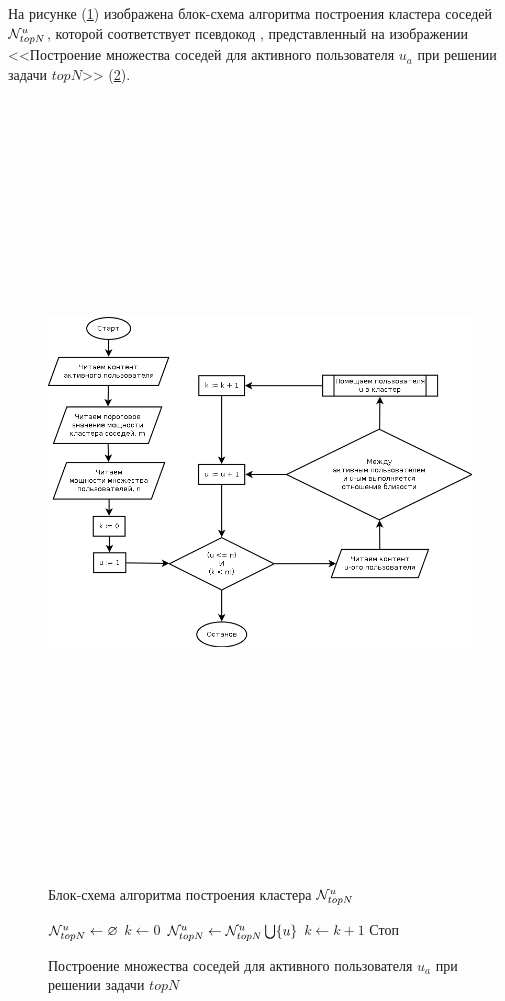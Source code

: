 На рисунке (\ref{dia:nut}) изображена блок-схема алгоритма
построения кластера соседей ${\mathcal{N}^u_{topN}}$, которой соответствует псевдокод
, представленный на изображении <<Построение множества соседей для активного
		пользователя $u_a$ при решении задачи $topN$>>
(\ref{alg:nut}).
\begin{figure}[htb]
	\caption{Блок-схема алгоритма построения кластера ${\mathcal{N}^u_{topN}}$}
\begin{center}
	\label{dia:nut}
 \includegraphics[width=7in,height=8in]{pics/algs/nut.png}
\end{center}
\end{figure}

\begin{figure}[htbp]
		\caption{Построение множества соседей для активного
		пользователя $u_a$ при решении задачи $topN$}
		\label{alg:nut}
		\begin{algorithmic}[1]
			\State ${\mathcal{N}^u_{topN}} \gets \varnothing$
			\State $k \gets 0$
			\State ${\mathcal{N}^u_{topN}} \gets {\mathcal{N}^u_{topN}} \bigcup \{ u \}$
			\State $k \gets k + 1$
			\EndIf
			\State Стоп
			\EndIf
			\EndFor
		\end{algorithmic}
\end{figure}



